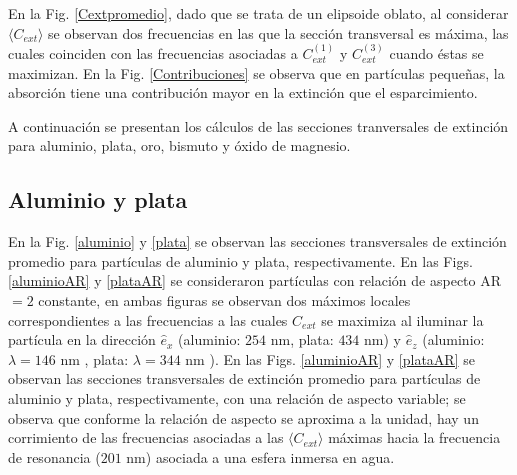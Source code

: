  En la Fig. \ref{Cextpromedio}, dado que se trata de un elipsoide oblato, al considerar $\langle C_{ext}\rangle$ se observan dos frecuencias en las que la sección transversal es máxima, las cuales coinciden con las frecuencias asociadas a $C_{ext}^{(1)}$ y $C_{ext}^{(3)}$ cuando éstas se maximizan. En la Fig. \ref{Contribuciones} se observa que en partículas pequeñas, la absorción tiene una contribución mayor en la extinción que el esparcimiento.

A continuación se presentan los cálculos de las secciones tranversales de extinción para aluminio, plata, oro, bismuto y óxido de magnesio.



\subsection*{Aluminio y plata}
En la Fig. \ref{aluminio} y \ref{plata} se observan las secciones transversales de extinción promedio para partículas de aluminio y plata, respectivamente. En las Figs. \ref{aluminioAR} y \ref{plataAR} se consideraron partículas con relación de aspecto AR$=2$ constante, en ambas figuras se observan dos máximos locales correspondientes a las frecuencias a las cuales $C_{ext}$ se maximiza al iluminar la partícula en la dirección $\hat{e}_x$ (aluminio: $254\text{ nm}$, plata: $434\text{ nm}$) y $\hat{e}_z$ (aluminio: $\lambda=146\text{ nm}$ , plata: $\lambda=344\text{ nm}$ ).  En las Figs. \ref{aluminioAR}  y \ref{plataAR} se observan las secciones transversales de extinción promedio para partículas de aluminio y plata, respectivamente, con una relación de aspecto variable; se observa que conforme la relación de aspecto se aproxima a la unidad, hay un corrimiento de las frecuencias asociadas a las $\langle C_{ext}\rangle$ máximas hacia la frecuencia de resonancia ($201\text{ nm}$) asociada a una esfera  inmersa en agua.

